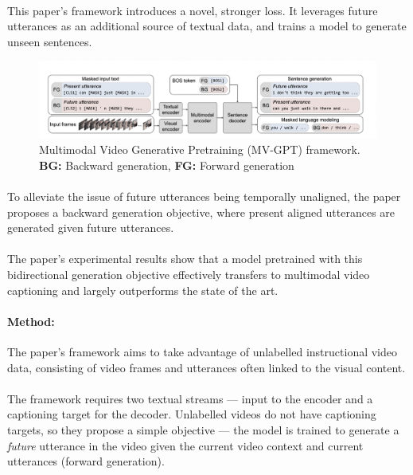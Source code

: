 \documentclass{article}
\begin{document}
\paragraph{}This paper's framework introduces a novel, stronger loss. It leverages future utterances as
an additional source of textual data, and trains a model to generate unseen sentences.


\begin{figure}

\includegraphics[width=11.6cm]{fig1}
\caption{Multimodal Video Generative Pretraining (MV-GPT) framework. \textbf{BG:} Backward generation, \textbf{FG:} Forward generation}



\end{figure}

\paragraph{}To alleviate the issue of future utterances being temporally unaligned, 
the paper proposes a backward generation objective, where present aligned utterances are 
generated given future utterances. 

\paragraph{}The paper's experimental results show that a model pretrained with this
bidirectional generation objective effectively transfers to multimodal video captioning
and largely outperforms the state of the art.

\paragraph{Method:} The paper's framework aims to take advantage of unlabelled instructional video data,
consisting of video frames and utterances often linked to the visual content.

\paragraph{}The framework requires two textual streams --- input to the encoder and a captioning target
for the decoder. Unlabelled videos do not have captioning targets, so they propose a simple
objective --- the model is trained to generate a \emph{future} utterance in the video given the current
video context and current utterances (forward generation). 
\end{document}
